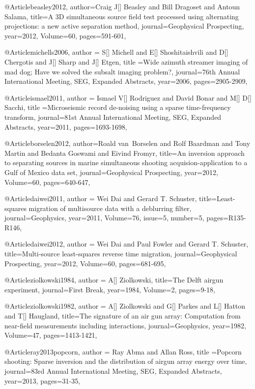 @Article{beasley2012,
  author={Craig J[] Beasley and Bill Dragoset and Antoun Salama},
  title={A 3{D} simultaneous source field test processed using alternating projections: a new active separation method},
  journal={Geophysical Prospecting},
  year=2012,
  Volume=60,
  pages={591-601},
}

@Article{michells2006,
  author = {S[] Michell and E[] Shoshitaishvili and D[] Chergotis and J[] Sharp and J[] Etgen},
  title ={Wide azimuth streamer imaging of mad dog; Have we solved the subsalt imaging problem?},
  journal={76th Annual International Meeting, SEG, Expanded Abstracts},
  year=2006,
  pages={2905-2909},
}

@Article{ismael2011,
  author = {Ismael V[] Rodriguez and David Bonar and M[] D[] Sacchi},
  title ={Microseismic record de-noising using a sparse time-frequency transform},
  journal={81st Annual International Meeting, SEG, Expanded Abstracts},
  year=2011,
  pages={1693-1698},
}

@Article{borselen2012,
  author={Roald van~Borselen and Rolf Baardman and Tony Martin and Bedanta Goswami and Eivind Fromyr},
  title={An inversion approach to separating sources in marine simultaneous shooting acquision-application to a Gulf of Mexico data set},
  journal={Geophysical Prospecting},
  year=2012,
  Volume=60,
  pages={640-647},
}

@Article{daiwei2011,
  author = {Wei Dai and Gerard T. Schuster},
  title={Least-squares migration of multisource data with a deblurring filter},
  journal={Geophysics},
  year=2011,
  Volume=76,
  issue=5,
  number=5,
  pages={R135-R146},
}

@Article{daiwei2012,
  author = {Wei Dai and Paul Fowler and Gerard T. Schuster},
  title={Multi-source least-squares reverse time migration},
  journal={Geophysical Prospecting},
  year=2012,
  Volume=60,
  pages={681-695},
}
	
@Article{ziolkowski1984,
  author = {A[] Ziolkowski},
  title={The Delft airgun experiment},
  journal={First Break},
  year=1984,
  Volume=2,
  pages={9-18},
}

@Article{ziolkowski1982,
  author = {A[] Ziolkowski and G[] Parkes and L[] Hatton and T[] Haugland},
  title={The signature of an air gun array:
Computation from near-field measurements including interactions},
  journal={Geophysics},
  year=1982,
  Volume=47,
  pages={1413-1421},
}

@Article{ray2013popcorn,
  author = {Ray Abma and Allan Ross},
  title ={Popcorn shooting: Sparse inversion and the distribution of airgun array energy over time},
  journal={83rd Annual International Meeting, SEG, Expanded Abstracts},
  year=2013,
  pages={31-35},
}

